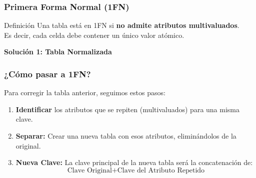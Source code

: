 \documentclass{beamer}
\begin{document}
\begin{frame}
  \frametitle{Primera Forma Normal (1FN)}

  \begin{alertblock}{Definición}
    Una tabla está en 1FN si \textbf{no admite atributos multivaluados}.
    \\ Es decir, cada celda debe contener un único valor atómico.
  \end{alertblock}

  \vspace{0.5em}
  \textbf{Solución 1: Tabla Normalizada}
  \begin{center}
  \end{center}
  
\end{frame}


\begin{frame}
  \frametitle{¿Cómo pasar a 1FN?}

  Para corregir la tabla anterior, seguimos estos pasos:

  \begin{enumerate}
      \item \textbf{Identificar} los atributos que se repiten (multivaluados) para una misma clave.
      \item \textbf{Separar:} Crear una nueva tabla con esos atributos, eliminándolos de la original.
      \item \textbf{Nueva Clave:} La clave principal de la nueva tabla será la concatenación de:
      $$ \text{Clave Original} + \text{Clave del Atributo Repetido} $$
  \end{enumerate}
\end{frame}
\end{document}
